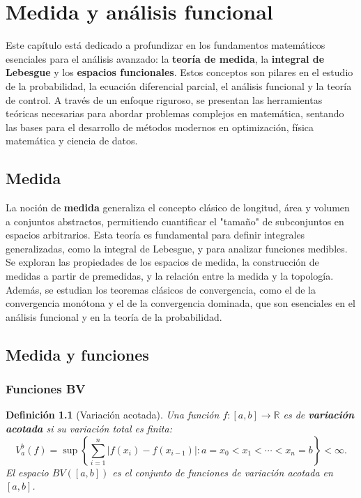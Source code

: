 \documentclass[12pt]{book}
\newtheorem{definition}{Definición}
\theoremstyle{definition}
\theoremstyle{plain}
\theoremstyle{remark}
\begin{document}
\chapter{Medida y análisis funcional}

Este capítulo está dedicado a profundizar en los fundamentos matemáticos esenciales para el análisis avanzado: la \textbf{teoría de medida}, la \textbf{integral de Lebesgue} y los \textbf{espacios funcionales}. Estos conceptos son pilares en el estudio de la probabilidad, la ecuación diferencial parcial, el análisis funcional y la teoría de control. A través de un enfoque riguroso, se presentan las herramientas teóricas necesarias para abordar problemas complejos en matemática, sentando las bases para el desarrollo de métodos modernos en optimización, física matemática y ciencia de datos.

\section{Medida}
La noción de \textbf{medida} generaliza el concepto clásico de longitud, área y volumen a conjuntos abstractos, permitiendo cuantificar el "tamaño" de subconjuntos en espacios arbitrarios. Esta teoría es fundamental para definir integrales generalizadas, como la integral de Lebesgue, y para analizar funciones medibles. Se exploran las propiedades de los espacios de medida, la construcción de medidas a partir de premedidas, y la relación entre la medida y la topología. Además, se estudian los teoremas clásicos de convergencia, como el de la convergencia monótona y el de la convergencia dominada, que son esenciales en el análisis funcional y en la teoría de la probabilidad.


\section{Medida y funciones}

\subsection{Funciones BV} %

\begin{definition}[Variación acotada]
Una función \(f: [a,b] \to \mathbb{R}\) es de \textbf{variación acotada} si su variación total es finita:
\[
V_a^b(f) = \sup \left\{ \sum_{i=1}^n |f(x_i) - f(x_{i-1})| : a = x_0 < x_1 < \cdots < x_n = b \right\} < \infty.
\]
El espacio \(BV([a,b])\) es el conjunto de funciones de variación acotada en \([a,b]\).
\end{definition}
\end{document}
